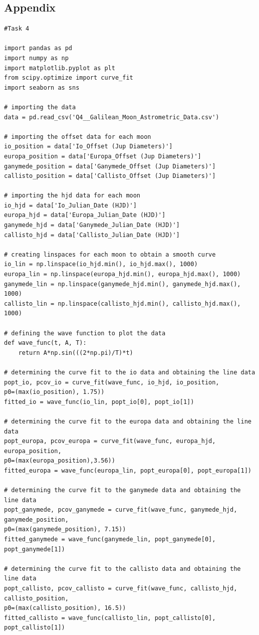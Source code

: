\documentclass[12pt, a4paper]{article}
\begin{document}
\subsection{Appendix}
\begin{verbatim}
#Task 4

import pandas as pd
import numpy as np
import matplotlib.pyplot as plt
from scipy.optimize import curve_fit
import seaborn as sns

# importing the data 
data = pd.read_csv('Q4__Galilean_Moon_Astrometric_Data.csv')

# importing the offset data for each moon
io_position = data['Io_Offset (Jup Diameters)']
europa_position = data['Europa_Offset (Jup Diameters)']
ganymede_position = data['Ganymede_Offset (Jup Diameters)']
callisto_position = data['Callisto_Offset (Jup Diameters)']

# importing the hjd data for each moon
io_hjd = data['Io_Julian_Date (HJD)']
europa_hjd = data['Europa_Julian_Date (HJD)']
ganymede_hjd = data['Ganymede_Julian_Date (HJD)']
callisto_hjd = data['Callisto_Julian_Date (HJD)']

# creating linspaces for each moon to obtain a smooth curve
io_lin = np.linspace(io_hjd.min(), io_hjd.max(), 1000)
europa_lin = np.linspace(europa_hjd.min(), europa_hjd.max(), 1000)
ganymede_lin = np.linspace(ganymede_hjd.min(), ganymede_hjd.max(), 1000)
callisto_lin = np.linspace(callisto_hjd.min(), callisto_hjd.max(), 1000)

# defining the wave function to plot the data
def wave_func(t, A, T):
    return A*np.sin(((2*np.pi)/T)*t)

# determining the curve fit to the io data and obtaining the line data
popt_io, pcov_io = curve_fit(wave_func, io_hjd, io_position, 
p0=(max(io_position), 1.75))
fitted_io = wave_func(io_lin, popt_io[0], popt_io[1])

# determining the curve fit to the europa data and obtaining the line data
popt_europa, pcov_europa = curve_fit(wave_func, europa_hjd, europa_position, 
p0=(max(europa_position),3.56))
fitted_europa = wave_func(europa_lin, popt_europa[0], popt_europa[1])

# determining the curve fit to the ganymede data and obtaining the line data
popt_ganymede, pcov_ganymede = curve_fit(wave_func, ganymede_hjd, ganymede_position, 
p0=(max(ganymede_position), 7.15))
fitted_ganymede = wave_func(ganymede_lin, popt_ganymede[0], popt_ganymede[1])

# determining the curve fit to the callisto data and obtaining the line data
popt_callisto, pcov_callisto = curve_fit(wave_func, callisto_hjd, callisto_position, 
p0=(max(callisto_position), 16.5))
fitted_callisto = wave_func(callisto_lin, popt_callisto[0], popt_callisto[1])


\end{verbatim}
\end{document}

